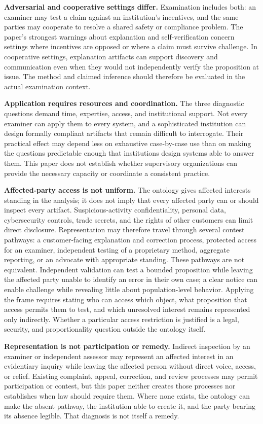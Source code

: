 \textbf{Adversarial and cooperative settings differ.} Examination includes
both: an examiner may test a claim against an institution's incentives, and the
same parties may cooperate to resolve a shared safety or compliance problem.
The paper's strongest warnings about explanation and self-verification concern
settings where incentives are opposed or where a claim must survive challenge.
In cooperative settings, explanation artifacts can support discovery and
communication even when they would not independently verify the proposition at
issue. The method and claimed inference should therefore be evaluated in the
actual examination context.

\textbf{Application requires resources and coordination.} The three diagnostic
questions demand time, expertise, access, and institutional support. Not every
examiner can apply them to every system, and a sophisticated institution can
design formally compliant artifacts that remain difficult to interrogate.
Their practical effect may depend less on exhaustive case-by-case use than on
making the questions predictable enough that institutions design systems able
to answer them. This paper does not establish whether supervisory organizations
can provide the necessary capacity or coordinate a consistent practice.

\textbf{Affected-party access is not uniform.} The ontology gives affected
interests standing in the analysis; it does not imply that every affected party
can or should inspect every artifact. Suspicious-activity confidentiality,
personal data, cybersecurity controls, trade secrets, and the rights of other
customers can limit direct disclosure. Representation may therefore travel
through several contest pathways: a customer-facing explanation and correction
process, protected access for an examiner, independent testing of a proprietary
method, aggregate reporting, or an advocate with appropriate standing. These
pathways are not equivalent. Independent validation can test a bounded
proposition while leaving the affected party unable to identify an error in
their own case; a clear notice can enable challenge while revealing little about
population-level behavior. Applying the frame requires stating who can access
which object, what proposition that access permits them to test, and which
unresolved interest remains represented only indirectly. Whether a particular
access restriction is justified is a legal, security, and proportionality
question outside the ontology itself.

\textbf{Representation is not participation or remedy.} Indirect inspection by
an examiner or independent assessor may represent an affected interest in an
evidentiary inquiry while leaving the affected person without direct voice,
access, or relief. Existing complaint, appeal, correction, and review processes
may permit participation or contest, but this paper neither creates those
processes nor establishes when law should require them. Where none exists, the
ontology can make the absent pathway, the institution able to create it, and the
party bearing its absence legible. That diagnosis is not itself a remedy.

